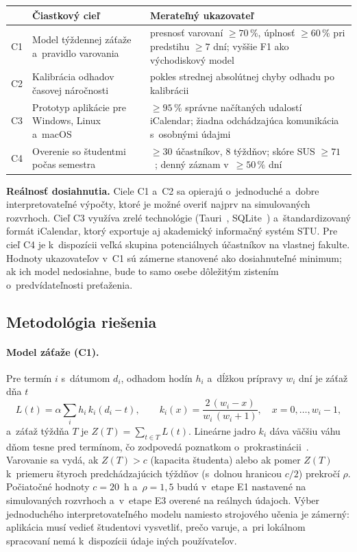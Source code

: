 \documentclass[11pt,a4paper]{article}
\begin{document}
\begin{center}
\small
\begin{tabularx}{\linewidth}{@{}lXX@{}}
\toprule
& \textbf{Čiastkový cieľ} & \textbf{Merateľný ukazovateľ} \\
\midrule
C1 & Model týždennej záťaže a~pravidlo varovania
   & presnosť varovaní $\geq 70\,\%$, úplnosť $\geq 60\,\%$ pri predstihu
     $\geq 7$ dní; vyššie F1 ako východiskový model \\
C2 & Kalibrácia odhadov časovej náročnosti
   & pokles strednej absolútnej chyby odhadu po kalibrácii \\
C3 & Prototyp aplikácie pre Windows, Linux a~macOS
   & $\geq 95\,\%$ správne načítaných udalostí iCalendar; žiadna
     odchádzajúca komunikácia s~osobnými údajmi \\
C4 & Overenie so študentmi počas semestra
   & $\geq 30$ účastníkov, 8 týždňov; skóre SUS $\geq 71$~\cite{Bangor:SUS};
     denný záznam v~$\geq 50\,\%$ dní \\
\bottomrule
\end{tabularx}
\end{center}

\textbf{Reálnosť dosiahnutia.} Ciele C1 a~C2 sa opierajú o~jednoduché
a~dobre interpretovateľné výpočty, ktoré je možné overiť najprv na
simulovaných rozvrhoch. Cieľ C3 využíva zrelé technológie (Tauri~\cite{Tauri},
SQLite~\cite{SQLite}) a~štandardizovaný formát iCalendar, ktorý exportuje
aj akademický informačný systém STU. Pre cieľ C4 je k~dispozícii veľká
skupina potenciálnych účastníkov na vlastnej fakulte. Hodnoty ukazovateľov
v~C1 sú zámerne stanovené ako dosiahnuteľné minimum; ak ich model nedosiahne,
bude to samo osebe dôležitým zistením o~predvídateľnosti preťaženia.

\subsection{Metodológia riešenia} \label{s:metodologia}

\paragraph{Model záťaže (C1).}
Pre termín $i$ s~dátumom $d_i$, odhadom hodín $h_i$ a~dĺžkou prípravy
$w_i$ dní je záťaž dňa $t$
\begin{equation*}
L(t) = \alpha \sum_i h_i \, k_i(d_i - t), \qquad
k_i(x) = \frac{2\,(w_i - x)}{w_i\,(w_i + 1)}, \quad x = 0, \ldots, w_i - 1,
\end{equation*}
a~záťaž týždňa $T$ je $Z(T) = \sum_{t \in T} L(t)$. Lineárne jadro
$k_i$ dáva väčšiu váhu dňom tesne pred termínom, čo zodpovedá poznatkom
o~prokrastinácii~\cite{Steel:Procrastination}. Varovanie sa vydá, ak
$Z(T) > c$ (kapacita študenta) alebo ak pomer $Z(T)$ k~priemeru štyroch
predchádzajúcich týždňov (s~dolnou hranicou $c/2$) prekročí $\rho$.
Počiatočné hodnoty $c = 20$~h a~$\rho = 1{,}5$ budú v~etape E1 nastavené
na simulovaných rozvrhoch a~v~etape E3 overené na reálnych údajoch.
Výber jednoduchého interpretovateľného modelu namiesto strojového učenia
je zámerný: aplikácia musí vedieť študentovi vysvetliť, prečo varuje,
a~pri lokálnom spracovaní nemá k~dispozícii údaje iných používateľov.
\end{document}
